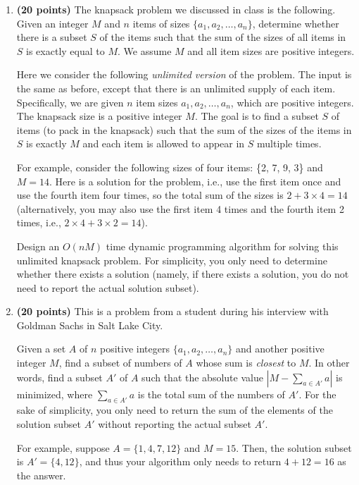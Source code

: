\documentclass[11pt]{article}
\begin{document}
\begin{enumerate}

\item
{\bf (20 points)}
The knapsack problem we discussed in class is the following. Given
an integer $M$ and $n$ items of sizes $\{a_1, a_2, \ldots,
a_n\}$, determine whether there is a subset $S$ of the items such that the sum of the sizes of
all items in $S$ is exactly equal to $M$. We assume $M$ and all item sizes are positive integers.

Here we consider the following {\em unlimited version} of the problem. The
input is the same as before, except that there is an unlimited supply of each item. Specifically, we are given $n$ item sizes $a_1,a_2,\ldots,a_n$, which are positive integers.
The knapsack size is a positive integer $M$. The goal is to find a subset $S$ of items (to pack in the knapsack) such that the sum of the sizes of the items in $S$ is exactly $M$ and
each item is allowed to appear in $S$ multiple times.


For example, consider the following sizes of four items: \{2, 7, 9, 3\} and $M=14$. Here is a solution for the problem, i.e., use the first item once and use the fourth item four times, so the total sum of the sizes is $2+3\times 4=14$ (alternatively, you may also use the first item 4 times and the fourth item 2 times, i.e., $2\times 4 + 3\times 2=14$).

Design an $O(nM)$ time dynamic programming algorithm for solving this unlimited
knapsack problem. For simplicity, you only need to determine whether
there exists a solution (namely, if
there exists a solution, you do not need to report the actual solution subset).



\item
 {\bf (20 points)}
This is a problem from a student during his interview with Goldman Sachs
in Salt Lake City.

Given a set $A$ of $n$ positive integers $\{a_1, a_2, \ldots, a_n\}$ and
another positive integer $M$, find a subset of numbers of $A$ whose
sum is {\em closest} to $M$. In other words, find a subset $A'$ of $A$ such
that the absolute value $|M-\sum_{a\in A'}a|$ is minimized, where $\sum_{a\in
A'}a$ is the total sum of the numbers of $A'$. For the sake of simplicity, you only need to return the sum of the elements of the solution subset $A'$ without reporting the actual subset $A'$.

For example, suppose $A=\{1,4,7,12\}$ and $M=15$. Then, the solution subset is $A'=\{4,12\}$, and thus your algorithm only needs to return $4+12=16$ as the answer.


\end{enumerate}
\end{document}
